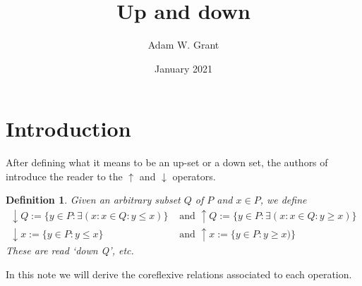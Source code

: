 \documentclass{article}
\title{Up and down}
\author{Adam W. Grant }
\date{January 2021}
\newtheorem*{defn}{Definition}
\begin{document}
\maketitle

\section{Introduction}
After defining what it means to be an up-set or a down set, the authors of \cite{davey_priestley_2002} introduce the reader to the $\uparrow$ and $\downarrow$ operators.
\begin{defn}
Given an arbitrary subset $Q$ of $P$ and $x \in P$, we define
\begin{align*} 
\downarrow Q := \{y \in P : \exists(x : x \in Q : y \leq x)\} &\text{ and }  \uparrow Q := \{y \in P : \exists(x : x \in Q : y \geq x)\} \\ 
\downarrow x := \{y \in P : y \leq x\} &\text{ and }  \uparrow x := \{y \in P : y \geq x)\}
\end{align*}
These are read `down Q', etc.
\end{defn}
In this note we will derive the coreflexive relations associated to each operation.
\end{document}
